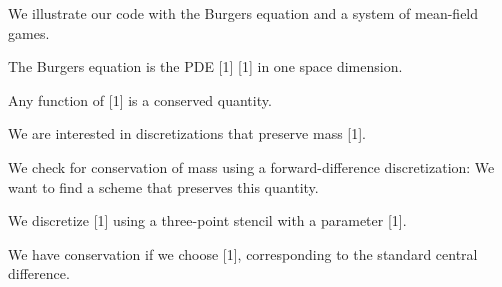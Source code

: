 \documentclass{amsart}
\begin{document}
\noindent {\color{green} ********************}

\noindent 

\noindent {\color{green} ********************}



\noindent {\color{green} ********************}

\noindent  We illustrate our code with the Burgers equation and a system of mean-field games.

\noindent  

\noindent {\color{green} ********************}



\noindent {\color{green} ********************}

\noindent  The Burgers equation is the PDE [1] [1] in one space dimension.

\noindent   Any function of [1] is a conserved quantity.

\noindent   We are interested in discretizations that preserve mass [1].

\noindent   We check for conservation of mass using a forward-difference discretization: We want to find a scheme that preserves this quantity.

\noindent  

\noindent {\color{green} ********************}



\noindent {\color{green} ********************}

\noindent  We discretize [1] using a three-point stencil with a parameter [1].

\noindent   We have conservation if we choose [1], corresponding to the standard central difference.

\noindent  
\end{document}
